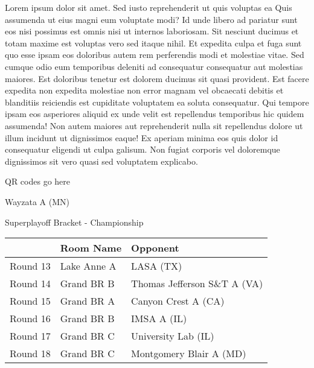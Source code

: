\documentclass{article}%
\begin{document}
\vspace*{8pt}%
\linebreak%
\newline%
\newline%
Lorem ipsum dolor sit amet. Sed iusto reprehenderit ut quis voluptas ea Quis assumenda ut eius magni eum voluptate modi? Id unde libero ad pariatur sunt eos nisi possimus est omnis nisi ut internos laboriosam. Sit nesciunt ducimus et totam maxime est voluptas vero sed itaque nihil. Et expedita culpa et fuga sunt quo esse ipsam eos doloribus autem rem perferendis modi et molestiae vitae.\newline%
\newline%
Sed cumque odio eum temporibus deleniti ad consequatur consequatur aut molestias maiores. Est doloribus tenetur est dolorem ducimus sit quasi provident. Est facere expedita non expedita molestiae non error magnam vel obcaecati debitis et blanditiis reiciendis est cupiditate voluptatem ea soluta consequatur. Qui tempore ipsam eos asperiores aliquid ex unde velit est repellendus temporibus hic quidem assumenda!\newline%
\newline%
Non autem maiores aut reprehenderit nulla sit repellendus dolore ut illum incidunt ut dignissimos eaque! Ex aperiam minima eos quis dolor id consequatur eligendi ut culpa galisum. Non fugiat corporis vel doloremque dignissimos sit vero quasi sed voluptatem explicabo.\newline%
\newline%
%
\vspace*{30pt}%
\begin{center}%
\begin{Huge}%
QR codes go here%
\end{Huge}%
\end{center}%
\newpage%
\begin{center}%
\begin{Huge}%
Wayzata A (MN)%
\end{Huge}%
\vspace*{8pt}%
\linebreak%
\begin{Large}%
Superplayoff Bracket {-} Championship%
\end{Large}%
\end{center}%
%
\begin{tabularx}{\textwidth}{|c|Y|Y|}%
\hline%
&Room Name&Opponent\\%
\hline%
Round 13&Lake Anne A&LASA (TX)\\%
Round 14&Grand BR B&Thomas Jefferson S\&T A (VA)\\%
Round 15&Grand BR A&Canyon Crest A (CA)\\%
Round 16&Grand BR B&IMSA A (IL)\\%
Round 17&Grand BR C&University Lab (IL)\\%
Round 18&Grand BR C&Montgomery Blair A (MD)\\%
\hline%
\end{tabularx}%
\end{document}
